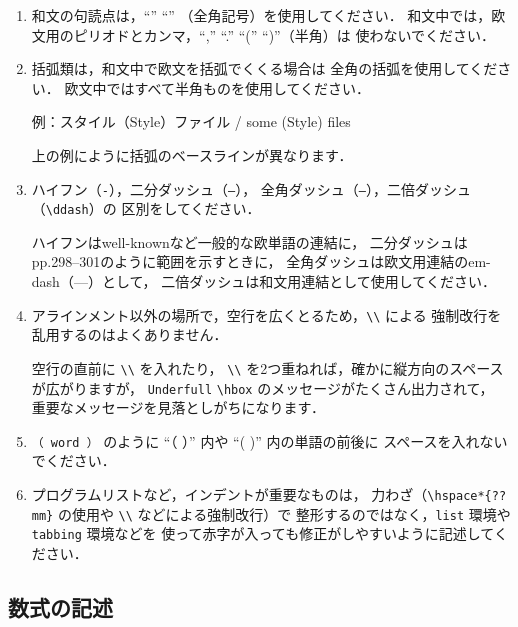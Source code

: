 \documentclass[technicalreport]{ieicej}
\begin{document}
\begin{enumerate}
\item
和文の句読点は，``'' ``''%
（全角記号）を使用してください．
和文中では，欧文用のピリオドとカンマ，``,'' ``.'' ``('' ``)''（半角）は
使わないでください．

\item
括弧類は，和文中で欧文を括弧でくくる場合は
全角の括弧を使用してください．
欧文中ではすべて半角ものを使用してください．

\noindent
例：スタイル（Style）ファイル / some (Style) files

上の例にように括弧のベースラインが異なります．

\item
ハイフン（\texttt{-}），二分ダッシュ（\texttt{--}），
全角ダッシュ（\texttt{---}），二倍ダッシュ（\verb/\ddash/）の
区別をしてください．

ハイフンはwell-knownなど一般的な欧単語の連結に，
二分ダッシュはpp.298--301のように範囲を示すときに，
全角ダッシュは欧文用連結のem-dash（---）として，
二倍ダッシュは和文用連結として使用してください．

\item
アラインメント以外の場所で，空行を広くとるため，\verb/\\/ による
強制改行を乱用するのはよくありません．

空行の直前に \verb/\\/ を入れたり，
\verb/\\/ を2つ重ねれば，確かに縦方向のスペースが広がりますが，
\texttt{Underfull} \verb/\hbox/ のメッセージがたくさん出力されて，
重要なメッセージを見落としがちになります\cite{jiyuu}．

\item
\verb*/（ word ）/ のように ``（ ）'' 内や ``( )'' 内の単語の前後に
スペースを入れないでください．

\item
プログラムリストなど，インデントが重要なものは，
力わざ（\verb/\hspace*{??mm}/ の使用や \verb/\\/ などによる強制改行）で
整形するのではなく，\texttt{list} 環境や \texttt{tabbing} 環境などを
使って赤字が入っても修正がしやすいように記述してください．
\end{enumerate}

\subsection{数式の記述}
\label{sec:equation1}
\end{document}
